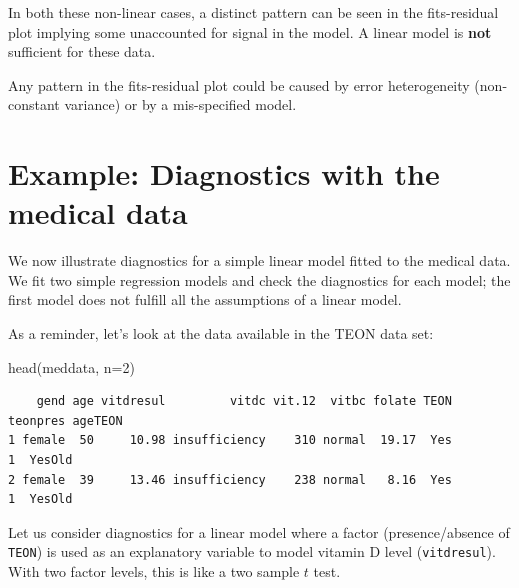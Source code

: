 \documentclass[
  oneside]{krantz}
\newenvironment{Shaded}{\begin{snugshade}}{\end{snugshade}}
\newcommand{\AttributeTok}[1]{\textcolor[rgb]{0.77,0.63,0.00}{#1}}
\newcommand{\CommentTok}[1]{\textcolor[rgb]{0.56,0.35,0.01}{\textit{#1}}}
\newcommand{\DecValTok}[1]{\textcolor[rgb]{0.00,0.00,0.81}{#1}}
\newcommand{\FunctionTok}[1]{\textcolor[rgb]{0.00,0.00,0.00}{#1}}
\newcommand{\NormalTok}[1]{#1}
\newcommand{\OtherTok}[1]{\textcolor[rgb]{0.56,0.35,0.01}{#1}}
\newcommand{\SpecialCharTok}[1]{\textcolor[rgb]{0.00,0.00,0.00}{#1}}
\newcommand{\StringTok}[1]{\textcolor[rgb]{0.31,0.60,0.02}{#1}}
\begin{document}
In both these non-linear cases, a distinct pattern can be seen in the fits-residual plot implying some unaccounted for signal in the model. A linear model is \textbf{not} sufficient for these data.

Any pattern in the fits-residual plot could be caused by error heterogeneity (non-constant variance) or by a mis-specified model.

\hypertarget{example-diagnostics-with-the-medical-data}{%
\section{Example: Diagnostics with the medical data}\label{example-diagnostics-with-the-medical-data}}

We now illustrate diagnostics for a simple linear model fitted to the medical data. We fit two simple regression models and check the diagnostics for each model; the first model does not fulfill all the assumptions of a linear model.

As a reminder, let's look at the data available in the TEON data set:

\begin{Shaded}
\begin{Highlighting}[]
\FunctionTok{head}\NormalTok{(meddata, }\AttributeTok{n=}\DecValTok{2}\NormalTok{)}
\end{Highlighting}
\end{Shaded}

\begin{verbatim}
    gend age vitdresul         vitdc vit.12  vitbc folate TEON teonpres ageTEON
1 female  50     10.98 insufficiency    310 normal  19.17  Yes        1  YesOld
2 female  39     13.46 insufficiency    238 normal   8.16  Yes        1  YesOld
\end{verbatim}

Let us consider diagnostics for a linear model where a factor (presence/absence of \texttt{TEON}) is used as an explanatory variable to model vitamin D level (\texttt{vitdresul}). With two factor levels, this is like a two sample \(t\) test.

\begin{Shaded}
\end{Shaded}
\end{document}
